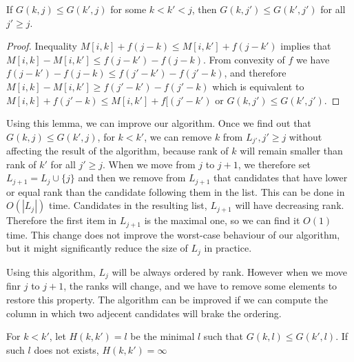 \begin{lemma}\label{OneStrikeAndOut}
If $G(k,j)\leq G(k',j)$ for some $k<k'<j$, then
$G(k,j')\leq G(k',j')$ for all $j'\geq j$. 
\end{lemma}


\begin{proof}

Inequality $M[i,k]+f(j-k)\leq M[i,k']+f(j-k')$ implies that
$M[i,k]-M[i,k']\leq f(j-k')-f(j-k)$. From convexity of $f$ we have
$f(j-k')-f(j-k)\leq f(j'-k')-f(j'-k)$, and therefore
$M[i,k]-M[i,k']\geq f(j'-k')-f(j'-k)$ which 
is equivalent to
$M[i,k]+f(j'-k)\leq M[i,k']+f[(j'-k')$ or $G(k,j')\leq G(k',j')$.

\end{proof}

Using this lemma, we can improve our algorithm.
Once we find out that $G(k,j)\leq
G(k',j)$, for $k<k'$, we can remove $k$ from $L_{j'}, j'\geq j$ without
affecting the result
of the algorithm, because rank of $k$ will remain smaller than rank of $k'$ for
all $j'\geq j$.
When we move from $j$ to $j+1$, we therefore set $L_{j+1}=L_{j}\cup\{j\}$ and
then
we remove from $L_{j+1}$ that candidates that have lower or equal rank than the 
candidate following them in the list.
This can be done in $O(|L_{j}|)$ time. Candidates in the resulting list,
$L_{j+1}$ will have decreasing rank. Therefore the first item in
$L_{j+1}$ is the maximal one, so we can find it $O(1)$ time.  This change
does not improve the worst-case behaviour of our algorithm, but it might
significantly reduce the  size of $L_j$ in practice. 


Using this algorithm, $L_j$ will be always ordered by rank. However when we move
finr $j$ to $j+1$, the ranks will change, and we have to remove some elements 
to restore this property. The algorithm can be improved if we can compute the column in
which two adjecent  candidates will brake the ordering.

\begin{definition}
For $k<k'$, let $H(k,k')=l$ be the minimal $l$ such that $G(k,l)\leq G(k',l)$. If such $l$ does
not exists,  $H(k,k')=\infty$ 
\end{definition}

